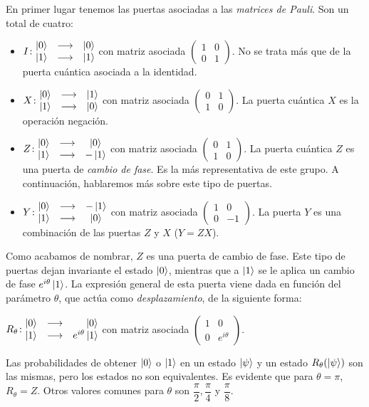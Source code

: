 En primer lugar tenemos las puertas asociadas a las \textit{matrices de Pauli}. Son un total de cuatro:
\begin{itemize}
\item $I\colon \begin{matrix}\left|0\right\rangle&\longrightarrow& \left|0\right\rangle\\ \left|1\right\rangle&\longrightarrow& \left|1\right\rangle\end{matrix}$ con matriz asociada $\left(\begin{matrix}1&0\\ 0&1\end{matrix}\right)$. No se trata más que de la puerta cuántica asociada a la identidad.
\item $X\colon \begin{matrix}\left|0\right\rangle&\longrightarrow& \left|1\right\rangle\\ \left|1\right\rangle&\longrightarrow& \left|0\right\rangle\end{matrix}$ con matriz asociada $\left(\begin{matrix}0&1\\ 1&0\end{matrix}\right)$. La puerta cuántica $X$ es la operación negación.
\item $Z\colon \begin{matrix}\left|0\right\rangle&\longrightarrow& \left|0\right\rangle\\ \left|1\right\rangle&\longrightarrow& -\left|1\right\rangle\end{matrix}$ con matriz asociada $\left(\begin{matrix}0&1\\ 1&0\end{matrix}\right)$. La puerta cuántica $Z$ es una puerta de \textit{cambio de fase}. Es la más representativa de este grupo. A continuación, hablaremos más sobre este tipo de puertas.
\item $Y\colon \begin{matrix}\left|0\right\rangle&\longrightarrow& -\left|1\right\rangle\\ \left|1\right\rangle&\longrightarrow& \left|0\right\rangle\end{matrix}$ con matriz asociada $\left(\begin{matrix}1&0\\ 0&-1\end{matrix}\right)$. La puerta $Y$ es una combinación de las puertas $Z$ y $X$ ($Y=ZX$).
\end{itemize}

Como acabamos de nombrar, $Z$ es una puerta de cambio de fase. Este tipo de puertas dejan invariante el estado $\left|0\right\rangle$, mientras que a $\left|1\right\rangle$ se le aplica un cambio de fase $e^{i\theta}\left|1\right\rangle$. La expresión general de esta puerta viene dada en función del parámetro $\theta$, que actúa como \textit{desplazamiento}, de la siguiente forma:

$\gatetwo{R_\theta}{\ \ \ \ \ket0}{e^{i\theta}\ket1}$ con matriz asociada $\left(\begin{matrix}1&0\\ 0&e^{i\theta}\end{matrix}\right)$.

Las probabilidades de obtener $\left|0\right\rangle$ o $\left|1\right\rangle$ en un estado $\left|\psi\right\rangle$ y un estado $R_\theta(\left|\psi\right\rangle)$ son las mismas, pero los estados no son equivalentes. Es evidente que para $\theta=\pi$, $R_\theta=Z$. Otros valores comunes para $\theta$ son $\dfrac{\pi}{2},\dfrac{\pi}{4}$ y $\dfrac{\pi}{8}$.

